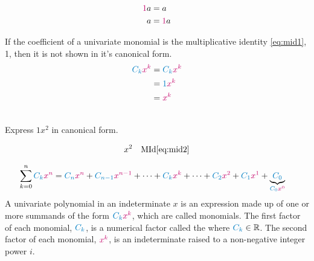\begin{definition}
\begin{subequations}
\begin{align}
\alert{1}a &= a \label{eq:mid1} \\
a &= \alert{1}a \label{eq:mid2} 
\end{align}
\end{subequations}
\end{definition}

\begin{remark}
If the coefficient of a univariate monomial is the multiplicative identity \ref{eq:mid1}, 1, then it is not shown in it's canonical form.
\begin{align*}
 \cBlue{C_{k}}\cRed{x^{k}}	& = \cBlue{C_{k}} \cRed{x^{k}} \\
 							& = \cBlue{1} \cRed{x^{k}} \\
                            & = \cRed{x^{k}}
\end{align*}
\end{remark}

\begin{example}[id:20141120-202842] \label{20141120-202842} \hfill \\

Express $1x^2$ in canonical form.

\soln

\solnsteps
\begin{align*}
x^2 && \text{MId} \eqref{eq:mid2} 
\end{align*}
\end{example}

\begin{definition}
\begin{align}
\sum\limits_{k=0}^n \cBlue{C_{k}}\cRed{x^{n}} & = \cBlue{C_{n}}\cRed{x^{n}}+\cBlue{C_{n-1}}\cRed{x^{n-1}}+ \cdots + \cBlue{C_{k}}\cRed{x^{k}} + \cdots + \cBlue{C_{2}}\cRed{x^{2}}+\cBlue{C_{1}}\cRed{x^{1}}+\underbrace{\cBlue{C_{0}}}_{\cBlue{C_{0}}\cRed{x^{0}}} 
\end{align}
A univariate polynomial in an indeterminate $x$ is an expression made up of one or more summands of the form $\cBlue{C_{k}}\cRed{x^{k}}$, which are called monomials.  The first factor of each monomial, $\cBlue{C_{k}}$, is a numerical factor called the  where $\cBlue{C_{k}} \in \real$. The second factor of each monomial, $\cRed{x^{k}}$, is an indeterminate raised to a non-negative integer power $i$.  

\hfill \cite{wikipedia:polynomial}
\end{definition}

